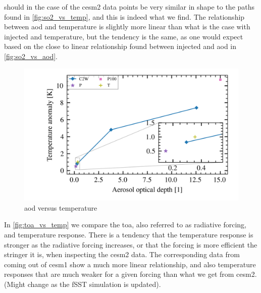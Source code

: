 \documentclass[twocol]{ametsocV5}
\newcommand{\iso}[1][i]{{#1}njected \ce{SO2}}
\begin{document}
 should in the case of the \acrshort{cesm2} data points be very
similar in shape to the paths found in \cref{fig:so2_vs_temp}, and this is indeed what
we find. The relationship between \acrshort{aod} and temperature is slightly more linear
than what is the case with \iso{} and temperature, but the tendency is the same, as one
would expect based on the close to linear relationship found between \iso{} and
\acrshort{aod} in \cref{fig:so2_vs_aod}.

\begin{figure}
  \begin{center}
    \includegraphics[width=0.95\linewidth]{figures/aod_vs_temperature.png}
  \end{center}
  \caption{\acrshort{aod} versus temperature}%
  \label{fig:aod_vs_temp}
\end{figure}

In \cref{fig:toa_vs_temp} we compare the \acrshort{toa}, also referred to as radiative
forcing, and temperature response. There is a tendency that the temperature response is
stronger as the radiative forcing increases, or that the forcing is more efficient the
stringer it is, when inspecting the \acrshort{cesm2} data. The corresponding data from
\citet{ottobliesner2016} coming out of \acrshort{cesm1} show a much more linear
relationship, and also temperature responses that are much weaker for a given forcing
than what we get from \acrshort{cesm2}. (Might change as the fSST simulation is
updated).
\end{document}
